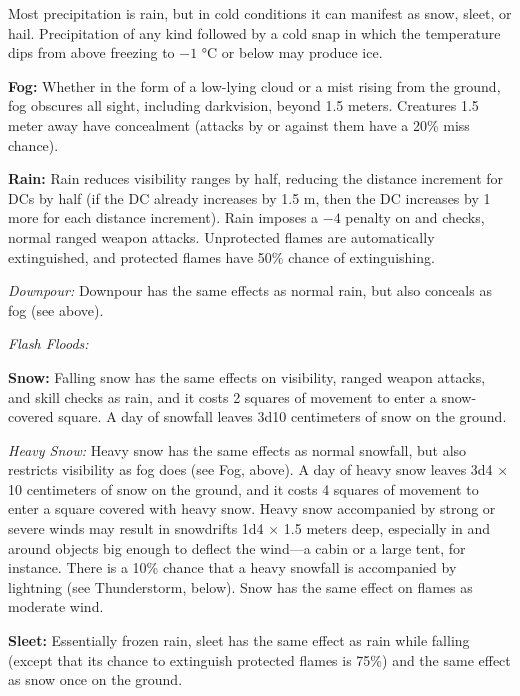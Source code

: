 Most precipitation is rain, but in cold conditions it can manifest as snow, sleet, or hail. Precipitation of any kind followed by a cold snap in which the temperature dips from above freezing to $-1$ °C or below may produce ice.

\textbf{Fog:} Whether in the form of a low-lying cloud or a mist rising from the ground, fog obscures all sight, including darkvision, beyond 1.5 meters. Creatures 1.5 meter away have concealment (attacks by or against them have a 20\% miss chance).

\textbf{Rain:} Rain reduces visibility ranges by half, reducing the distance increment for  DCs by half (if the DC already increases by 1.5 m, then the DC increases by 1 more for each distance increment). Rain imposes a $-4$ penalty on  and  checks, normal ranged weapon attacks. Unprotected flames are automatically extinguished, and protected flames have 50\% chance of extinguishing.%

\textit{Downpour:} Downpour has the same effects as normal rain, but also conceals as fog (see above).

\textit{Flash Floods:}

\textbf{Snow:} Falling snow has the same effects on visibility, ranged weapon attacks, and skill checks as rain, and it costs 2 squares of movement to enter a snow-covered square. A day of snowfall leaves 3d10 centimeters of snow on the ground.

\textit{Heavy Snow:} Heavy snow has the same effects as normal snowfall, but also restricts visibility as fog does (see Fog, above). A day of heavy snow leaves 3d4 $\times$ 10 centimeters of snow on the ground, and it costs 4 squares of movement to enter a square covered with heavy snow. Heavy snow accompanied by strong or severe winds may result in snowdrifts 1d4 $\times$ 1.5 meters deep, especially in and around objects big enough to deflect the wind---a cabin or a large tent, for instance. There is a 10\% chance that a heavy snowfall is accompanied by lightning (see Thunderstorm, below). Snow has the same effect on flames as moderate wind.

\textbf{Sleet:} Essentially frozen rain, sleet has the same effect as rain while falling (except that its chance to extinguish protected flames is 75\%) and the same effect as snow once on the ground.

